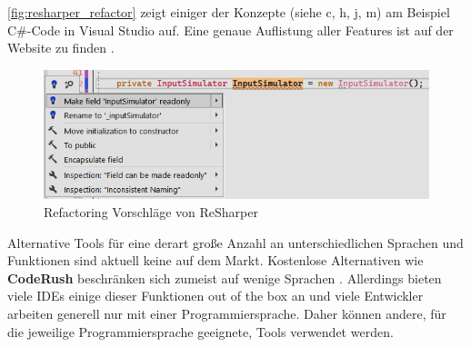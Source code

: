 \autoref{fig:resharper_refactor} zeigt einiger der Konzepte (siehe c, h, j, m) am Beispiel C\#-Code in Visual Studio auf. Eine genaue Auflistung aller Features ist auf der Website zu finden \cite{ReShaperRefactoring}. 
\begin{figure}[!htb] 
	\centering
	\includegraphics[width=125mm]{images/resharper_refac.png}
	\caption{Refactoring Vorschläge von ReSharper}
	\label{fig:resharper_refactor}
\end{figure}
\FloatBarrier

Alternative Tools für eine derart große Anzahl an unterschiedlichen Sprachen und Funktionen sind aktuell keine auf dem Markt. Kostenlose Alternativen wie \textbf{CodeRush} beschränken sich zumeist auf wenige Sprachen \cite{DocumentationCodeRush}. Allerdings bieten viele IDEs einige dieser Funktionen out of the box an und viele Entwickler arbeiten generell nur mit einer Programmiersprache. Daher können andere, für die jeweilige Programmiersprache geeignete, Tools verwendet werden.